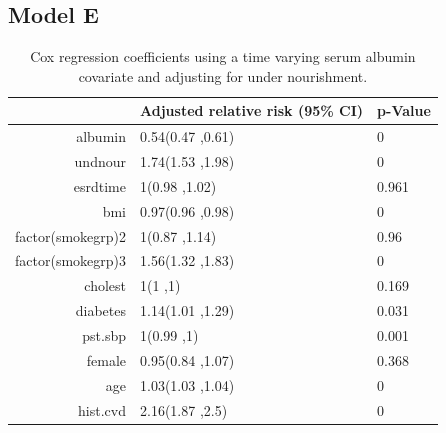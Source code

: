 \documentclass[paper=a4, fontsize=11pt]{scrartcl} %
\numberwithin{equation}{section} %
\numberwithin{figure}{section} %
\numberwithin{table}{section} %
\begin{document}
\subsection{Model E}
\begin{table}[H]
\centering
\begin{tabular}{rll}
  \hline
 & Adjusted relative risk (95\% CI) & p-Value \\ 
  \hline
albumin & 0.54(0.47 ,0.61) & 0 \\ 
  undnour & 1.74(1.53 ,1.98) & 0 \\ 
  esrdtime & 1(0.98 ,1.02) & 0.961 \\ 
  bmi & 0.97(0.96 ,0.98) & 0 \\ 
  factor(smokegrp)2 & 1(0.87 ,1.14) & 0.96 \\ 
  factor(smokegrp)3 & 1.56(1.32 ,1.83) & 0 \\ 
  cholest & 1(1 ,1) & 0.169 \\ 
  diabetes & 1.14(1.01 ,1.29) & 0.031 \\ 
  pst.sbp & 1(0.99 ,1) & 0.001 \\ 
  female & 0.95(0.84 ,1.07) & 0.368 \\ 
  age & 1.03(1.03 ,1.04) & 0 \\ 
  hist.cvd & 2.16(1.87 ,2.5) & 0 \\ 
   \hline
\end{tabular}
\caption{Cox regression coefficients using a time varying serum albumin covariate and adjusting for under nourishment.}
\label{tab:model_e}
\end{table}
\end{document}
